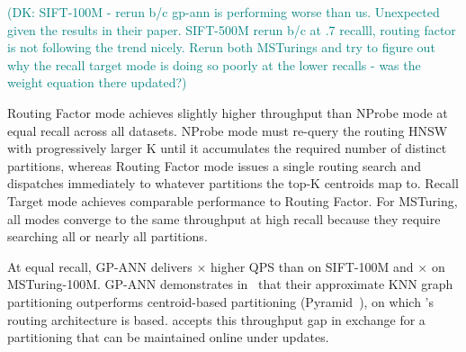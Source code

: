 \documentclass[sigconf,review,anonymous]{acmart}
\newcommand{\dk}[1]{\textcolor{teal}{(DK: #1)}}
\begin{document}
\dk{SIFT-100M - rerun b/c gp-ann is performing worse than us. Unexpected given the results in their paper. SIFT-500M rerun b/c at .7 recalll, routing factor is not following the trend nicely. Rerun both MSTurings and try to figure out why the recall target mode is doing so poorly at the lower recalls - was the weight equation there updated?}

Routing Factor mode achieves slightly higher throughput than NProbe mode at equal recall across all datasets. NProbe mode must re-query the routing HNSW with progressively larger K until it accumulates the required number of distinct partitions, whereas Routing Factor mode issues a single routing search and dispatches immediately to whatever partitions the top-K centroids map to. Recall Target mode achieves comparable performance to Routing Factor. For MSTuring, all modes converge to the same throughput at high recall because they require searching all or nearly all partitions.



At equal recall, GP-ANN delivers $\times$ higher QPS than \SystemName{} on SIFT-100M and $\times$ on MSTuring-100M. GP-ANN demonstrates in~\cite{gottensuren2025unleashing} that their approximate KNN graph partitioning outperforms centroid-based partitioning (Pyramid~\cite{deng2019pyramid}), on which \SystemName{}'s routing architecture is based. \SystemName{} accepts this throughput gap in exchange for a partitioning that can be maintained online under updates.

\end{document}

